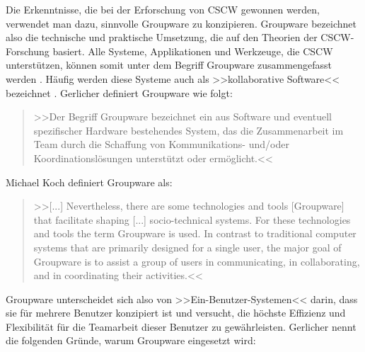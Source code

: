	\bigskip Die Erkenntnisse, die bei der Erforschung von \ac{CSCW} gewonnen werden, verwendet man dazu, sinnvolle Groupware  zu konzipieren. Groupware bezeichnet also die technische und praktische Umsetzung, die auf den Theorien der \ac{CSCW}-Forschung basiert. Alle Systeme, Applikationen und Werkzeuge, die \ac{CSCW} unterstützen, können somit unter dem Begriff Groupware zusammengefasst werden \citep{Koch2008, Gerlicher:2007p241}. Häufig werden diese Systeme auch als >>kollaborative Software<< bezeichnet \citep{Bannon:1990p244}. Gerlicher definiert Groupware wie folgt:
	
	\clearpage
	
	\medskip\begin{quote}>>Der Begriff Groupware bezeichnet ein aus Software und eventuell spezifischer Hardware bestehendes System, das die Zusammenarbeit im Team durch die Schaffung von Kommunikations- und/oder Koordinationslösungen unterstützt oder ermöglicht.<< \begin{flushright}\citep{Gerlicher:2007p241}\end{flushright}\end{quote}
	
	\medskip Michael Koch definiert Groupware als:
	
	\medskip\begin{quote}>>[...] Nevertheless, there are some technologies and tools [Groupware] that facilitate shaping [...] socio-technical systems. For these technologies and tools the term Groupware is used. In contrast to traditional computer systems that are primarily designed for a single user, the major goal of Groupware is to assist a group of users in communicating, in collaborating, and in coordinating their activities.<< \begin{flushright}\citep{Koch2008}\end{flushright}\end{quote}
	
	\medskip Groupware unterscheidet sich also von >>Ein-Benutzer-Systemen<< darin, dass sie für mehrere Benutzer konzipiert ist und versucht, die höchste Effizienz und Flexibilität für die Teamarbeit dieser Benutzer zu gewährleisten. Gerlicher nennt die folgenden Gründe, warum Groupware eingesetzt wird: 
	
